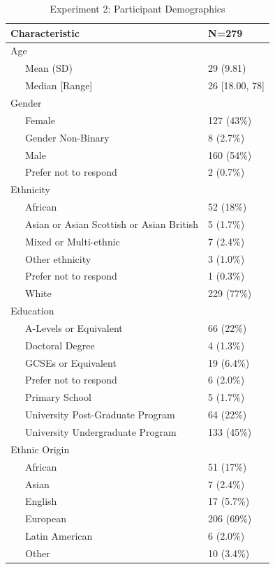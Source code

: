 \documentclass[
  donotrepeattitle,doc, 12pt, a4paper,floatsintext]{apa7}
\begin{document}
\begin{table}[tbp]

\begin{center}
\begin{threeparttable}

\caption{\label{tab:demographicTableExperiment2}Experiment 2: Participant Demographics}

\begin{tabular}{ll}
\toprule
Characteristic & N=279\\
\midrule
Age & \\
\ \ \ Mean (SD) & 29 (9.81)\\
\ \ \ Median [Range] & 26 [18.00, 78]\\
Gender & \\
\ \ \ Female & 127 (43\%)\\
\ \ \ Gender Non-Binary & 8 (2.7\%)\\
\ \ \ Male & 160 (54\%)\\
\ \ \ Prefer not to respond & 2 (0.7\%)\\
Ethnicity & \\
\ \ \ African & 52 (18\%)\\
\ \ \ Asian  or  Asian Scottish  or  Asian British & 5 (1.7\%)\\
\ \ \ Mixed  or  Multi-ethnic & 7 (2.4\%)\\
\ \ \ Other ethnicity & 3 (1.0\%)\\
\ \ \ Prefer not  to respond & 1 (0.3\%)\\
\ \ \ White & 229 (77\%)\\
Education & \\
\ \ \ A-Levels  or  Equivalent & 66 (22\%)\\
\ \ \ Doctoral  Degree & 4 (1.3\%)\\
\ \ \ GCSEs  or  Equivalent & 19 (6.4\%)\\
\ \ \ Prefer not  to respond & 6 (2.0\%)\\
\ \ \ Primary School & 5 (1.7\%)\\
\ \ \ University  Post-Graduate  Program & 64 (22\%)\\
\ \ \ University  Undergraduate  Program & 133 (45\%)\\
Ethnic Origin & \\
\ \ \ African & 51 (17\%)\\
\ \ \ Asian & 7 (2.4\%)\\
\ \ \ English & 17 (5.7\%)\\
\ \ \ European & 206 (69\%)\\
\ \ \ Latin American & 6 (2.0\%)\\
\ \ \ Other & 10 (3.4\%)\\
\bottomrule
\end{tabular}

\end{threeparttable}
\end{center}

\end{table}
\end{document}
